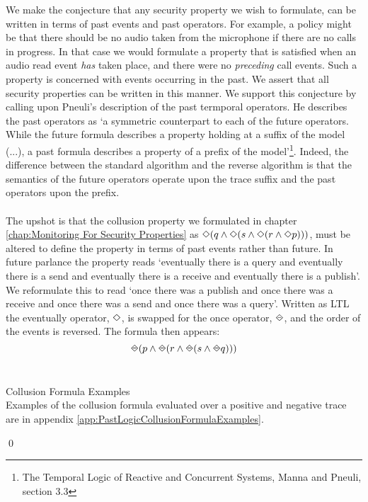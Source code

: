We make the conjecture that any security property we wish to formulate, can be written in terms of past events and past operators.  For example, a policy might be that there should be no audio taken from the microphone if there are no calls in progress.  In that case we would formulate a property that is satisfied when an audio read event \textit{has} taken place, and there were no \textit{preceding} call events.  Such a property is concerned with events occurring in the past.  We assert that all security properties can be written in this manner.  We support this conjecture by calling upon Pneuli's description of the past termporal operators.  He describes the past operators as `a symmetric counterpart to each of the future operators.  While the future formula describes a property holding at a suffix of the model (...), a past formula describes a property of a prefix of the model'\footnote{The Temporal Logic of Reactive and Concurrent Systems, Manna and Pneuli, section 3.3}.  Indeed, the difference between the standard algorithm and the reverse algorithm is that the semantics of the future operators operate upon the trace suffix and the past operators upon the prefix.\\
\\
\noindent
The upshot is that the collusion property we formulated in chapter \ref{chap:Monitoring For Security Properties} as $\Diamond(q \land \Diamond(s \land \Diamond(r \land \Diamond p)))$, must be altered to define the property in terms of past events rather than future.  In future parlance the property reads `eventually there is a query and eventually there is a send and eventually there is a receive and eventually there is a publish'.  We reformulate this to read `once there was a publish and once there was a receive and once there was a send and once there was a query'.  Written as LTL the eventually operator, $\Diamond$, is swapped for the once operator, $\LTLonce$, and the order of the events is reversed.  The formula then appears:\\

$$\LTLonce(p \land \LTLonce(r \land \LTLonce(s \land \LTLonce q)))$$\\  

\begin{myEx} Collusion Formula Examples\\

Examples of the collusion formula evaluated over a positive and negative trace are in appendix \ref{app:PastLogicCollusionFormulaExamples}.

\qed
\end{myEx}

